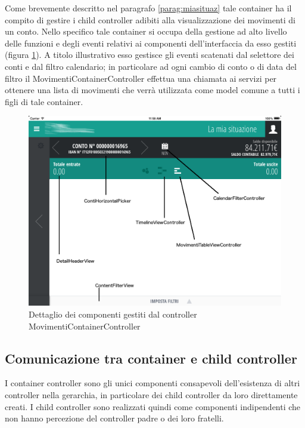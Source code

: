 Come brevemente descritto nel paragrafo \ref{parag:miasituaz} tale container ha il compito di gestire i child controller adibiti alla visualizzazione dei movimenti di un conto. 
Nello specifico tale container si occupa della gestione ad alto livello delle funzioni e degli eventi relativi ai componenti dell'interfaccia da esso gestiti (figura \ref{fig:movimenticontainer}). A titolo illustrativo esso gestisce gli eventi scatenati dal selettore dei conti e dal filtro calendario; in particolare ad ogni cambio di conto o di data del filtro il MovimentiContainerController effettua una chiamata ai servizi per ottenere una lista di movimenti che verrà utilizzata come model comune a tutti i figli di tale container.

\begin{figure}[!htbp]
\centering
\includegraphics[scale=0.35]{dettagli/movimenticontainer.png}
\caption{Dettaglio dei componenti gestiti dal controller MovimentiContainerController}
\label{fig:movimenticontainer}
\end{figure}

\subsection{Comunicazione tra container e child controller}
I container controller sono gli unici componenti consapevoli dell'esistenza di altri controller nella gerarchia, in particolare dei child controller da loro direttamente creati.
I child controller sono realizzati quindi come componenti indipendenti che non hanno percezione del controller padre o dei loro fratelli. 

